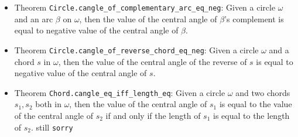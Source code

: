 \documentclass[12pt]{amsart}
\begin{document}
\begin{itemize}
    \item Theorem \verb|Circle.cangle_of_complementary_arc_eq_neg|: Given a circle $\omega$ and an arc $\beta$ on $\omega$, then the value of the central angle of $\beta$'s complement is equal to negative value of the central angle of $\beta$.
    \item Theorem \verb|Circle.cangle_of_reverse_chord_eq_neg|: Given a circle $\omega$ and a chord $s$ in $\omega$, then the value of the central angle of the reverse of $s$ is equal to negative value of the central angle of $s$.
    \item Theorem \verb|Chord.cangle_eq_iff_length_eq|: Given a circle $\omega$ and two chords $s_1,s_2$ both in $\omega$, then the value of the central angle of $s_1$ is equal to the value of the central angle of $s_2$ if and only if the length of $s_1$ is equal to the length of $s_2$. {\color{red} still \verb|sorry|}
\end{itemize}
\end{document}
